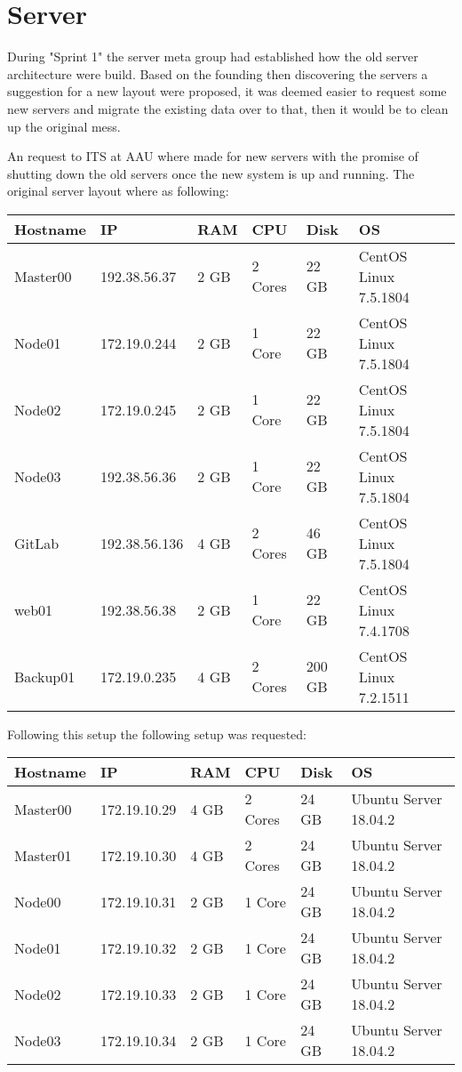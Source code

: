 \section{Server}\label{SEC:S2ServerWork}
During "Sprint 1" the server meta group had established how the old server architecture were build. 
Based on the founding then discovering the servers a suggestion for a new layout were proposed, it was deemed easier to request some new servers and migrate the existing data over to that, then it would be to clean up the original mess. 

An request to ITS at AAU where made for new servers with the promise of shutting down the old servers once the new system is up and running. The original server layout where as following:

\begin{table}[H]

\begin{tabular}{|l|l|l|l|l|l|}
\hline
Hostname & IP 			& RAM 	& CPU 		& Disk 	& OS 					\\ \hline
Master00 & 192.38.56.37 	& 2 GB 	& 2 Cores 	& 22 GB 	& CentOS Linux 7.5.1804 	\\ \hline
Node01 	& 172.19.0.244 	& 2 GB 	& 1 Core 	& 22 GB 	& CentOS Linux 7.5.1804 	\\ \hline
Node02	& 172.19.0.245	& 2 GB	& 1 Core		& 22 GB	& CentOS Linux 7.5.1804	\\ \hline
Node03	& 192.38.56.36	& 2 GB	& 1 Core 	& 22 GB	& CentOS Linux 7.5.1804 	\\ \hline
GitLab 	& 192.38.56.136	& 4 GB	& 2 Cores 	& 46 GB 	& CentOS Linux 7.5.1804 	\\ \hline
web01	& 192.38.56.38	& 2 GB	& 1 Core		& 22 GB 	& CentOS Linux 7.4.1708 	\\ \hline
Backup01	& 172.19.0.235	& 4 GB	& 2 Cores	& 200 GB & CentOS Linux 7.2.1511 	\\ \hline
\end{tabular}
\end{table}

Following this setup the following setup was requested:

\begin{table}[H]
\begin{tabular}{|l|l|l|l|l|l|}
\hline
Hostname & IP				& RAM 	& CPU 		& Disk 	& OS 					\\ \hline
Master00 & 172.19.10.29	& 4 GB	& 2 Cores	& 24 GB	& Ubuntu Server 18.04.2	\\ \hline
Master01 & 172.19.10.30	& 4 GB	& 2 Cores	& 24 GB	& Ubuntu Server 18.04.2	\\ \hline			
Node00 	& 172.19.10.31	& 2 GB	& 1 Core		& 24 GB	& Ubuntu Server 18.04.2	\\ \hline
Node01 	& 172.19.10.32	& 2 GB	& 1 Core		& 24 GB	& Ubuntu Server 18.04.2	\\ \hline
Node02 	& 172.19.10.33	& 2 GB	& 1 Core		& 24 GB	& Ubuntu Server 18.04.2	\\ \hline
Node03 	& 172.19.10.34	& 2 GB	& 1 Core		& 24 GB	& Ubuntu Server 18.04.2	\\ \hline
\end{tabular}
\end{table}

